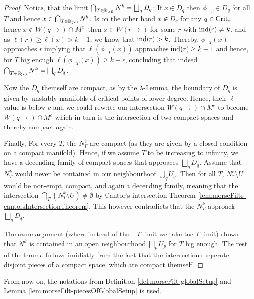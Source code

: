 \begin{proof}
	Notice, that the limit $\bigcap_{T\in \mathbb{R}_{>0}} N^k=\bigsqcup_q D_q$: If $x\in D_q$ then $\phi_{-T}\in D_q$ for all $T$ and hence $x\in \bigcap_{T\in \mathbb{R}_{>0}} N^k$. Is on the other hand $x\notin D_q$ for any $q\in \mathrm{Crit}_k$ hence $x\notin W(q\to)\cap M^c$, then $x\in W(r\to)$ for some $r$ with $\mathrm{ind}(r)\neq k$, and as $\ell(r)\geq \ell(x)>{k-1}$, we know that $\mathrm{ind}(r)>k$. Thereby, $\phi_{-T}(x)$ approaches $r$ implying that $\ell(\phi_{-T}(x))$ approaches $\mathrm{ind}(r)\geq{k+1}$ and hence, for $T$ big enough $\ell(\phi_{-T}(x))\geq k+\epsilon$, concluding that indeed $\bigcap_{T\in \mathbb{R}_{>0}} N^k=\bigsqcup_q D_q$.


	Now the $D_q$ themself are compact, as by the $\lambda$-Lemma, the boundary of $D_q$ is given by unstably manifolds of critical points of lower degree. Hence, their $\ell$-value is below $c$ and we could rewrite our intersection $W(q\to)\cap M^c$ to become $\overline{W(q\to)\cap M^c}$ which in turn is the intersection of two compact spaces and thereby compact again.


	Finally, For every $T$, the $N^k_T$ are compact (as they are given by a closed condition on a compact manifold). Hence, if we assume $T$ to be increasing to infinity, we have a decending family of compact spaces that approaces $\bigsqcup_q D_q$. Assume that $N^k_T$ would never be contained in our neighbourhoof $\bigcup_q U_q$. Then for all $T$, $N^k_T\setminus U$ would be non-empt, compact, and again a decending family, meaning that the intersection $\bigcap_T (N^k_T\setminus U)\neq \emptyset$ by Cantor's intersection Theorem \ref{lem:morseFiltr-cantorsIntersectionTheorem}. This however contradicts that the $N^k_T$ approach $\bigsqcup_q D_q$.

	The same argument (where instead of the $-T$-limit we take toe $T$-limit) shows that $N^k$ is contained in an open neighbourhood $\bigsqcup_p U_p$ for $T$ big enough. The rest of the lemma follows imidiatly from the fact that the intersections seperate disjoint pieces of a compact space, which are compact themself.
\end{proof}
From now on, the notations from Definition \ref{def:morseFilt-globalSetup} and Lemma \ref{lem:morseFilt-piecesOfGlobalSetup} is used.

